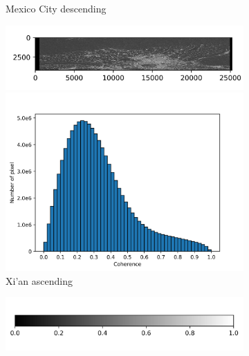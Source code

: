 \documentclass[preprint, authoryear]{elsarticle}
\begin{document}
\begin{figure}
\begin{subfigure}{0.5\textwidth}
\begin{minipage}{0.5\textwidth}
        \end{minipage}
        \caption{Mexico City descending}
        \label{fig_6d}
    \end{subfigure}%
    \hfill
    \begin{subfigure}{0.5\textwidth}
        \centering
        \begin{minipage}{0.5\textwidth}
            \centering
            \includegraphics[width=\textwidth]{figure/The coherence/coh_XiAn_asc_esd1.png}
        \end{minipage}%
        \begin{minipage}{0.5\textwidth}
            \centering
            \includegraphics[width=\textwidth]{figure/The coherence/coh_XiAn_asc_esd1_histogram_.png}
        \end{minipage}
        \caption{Xi'an ascending}
        \label{fig_6e}
    \end{subfigure}%
    \begin{subfigure}{0.5\textwidth}
        \centering
        \includegraphics[width=\textwidth]{figure/The coherence/colorbar.png}

\end{subfigure}
\end{figure}
\end{document}

